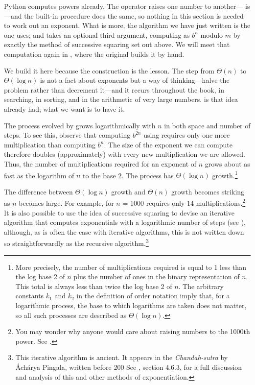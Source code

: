 \noindent
\begin{revealTheSurface}
Python computes powers already.  The operator \code{**} raises one number to
another--- is ---and the built-in procedure
 does the same, so nothing in this section is needed to work out an
exponent.  What is more, the algorithm we have just written is the one
 uses; and  takes an optional third argument, computing
 as \( b^n \) modulo \( m \) by exactly the method of
successive squaring set out above.  We will meet that computation again in
, where the original builds it by hand.

We build it here because the construction is the lesson.  The step from
\( \Theta(n) \) to \( \Theta(\log n) \) is not a fact about exponents but a
way of thinking---halve the problem rather than decrement it---and it recurs
throughout the book, in searching, in sorting, and in the arithmetic of very
large numbers.  \code{**} is that idea already had; what we want is to have it.
\end{revealTheSurface}

The process evolved by  grows logarithmically with \( n \) in
both space and number of steps.  To see this, observe that computing
\( b^{2n} \) using  requires only one more multiplication
than computing \( b^n \).  The size of the exponent we can compute therefore
doubles (approximately) with every new multiplication we are allowed.  Thus,
the number of multiplications required for an exponent of \( n \) grows about as
fast as the logarithm of \( n \) to the base 2.  The process has
\( \Theta(\log n) \) growth.\footnote{More precisely, the number of
multiplications required is equal to 1 less than the log base 2 of \( n \) plus
the number of ones in the binary representation of \( n \).  This total is always
less than twice the log base 2 of \( n \).  The arbitrary constants \( k_1 \) and
\( k_2 \) in the definition of order notation imply that, for a logarithmic
process, the base to which logarithms are taken does not matter, so all such
processes are described as \( \Theta(\log n) \).}

The difference between \( \Theta(\log n) \) growth and
\( \Theta(n) \) growth becomes striking as \( n \) becomes large.  For
example,  for \( n \) = 1000 requires only 14
multiplications.\footnote{You may wonder why anyone would care about raising
numbers to the 1000th power.  See .} It is also possible to
use the idea of successive squaring to devise an iterative algorithm that
computes exponentials with a logarithmic number of steps (see ),
although, as is often the case with iterative algorithms, this is not
written down so straightforwardly as the recursive algorithm.\footnote{This
iterative algorithm is ancient.  It appears in the \textit{Chandah-sutra} by
\'Ach\'arya Pingala, written before 200  See , section
4.6.3, for a full discussion and analysis of this and other methods of
exponentiation.}

